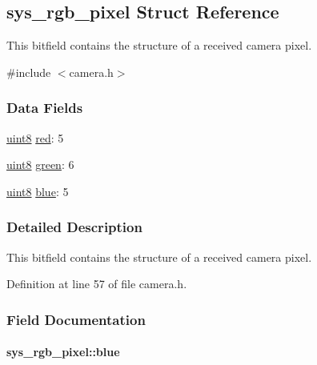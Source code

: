 \hypertarget{structsys__rgb__pixel}{}\subsection{sys\+\_\+rgb\+\_\+pixel Struct Reference}
\label{structsys__rgb__pixel}


This bitfield contains the structure of a received camera pixel.  




{\ttfamily \#include $<$camera.\+h$>$}

\subsubsection*{Data Fields}
\begin{DoxyCompactItemize}
\item 
\hyperlink{definitions_8h_adde6aaee8457bee49c2a92621fe22b79}{uint8} \hyperlink{structsys__rgb__pixel_a5238b3616428441f13d6afbaa3f9d538}{red}\+: 5
\item 
\hyperlink{definitions_8h_adde6aaee8457bee49c2a92621fe22b79}{uint8} \hyperlink{structsys__rgb__pixel_a7186eba1f72a58f28ff7a04caaffb8f6}{green}\+: 6
\item 
\hyperlink{definitions_8h_adde6aaee8457bee49c2a92621fe22b79}{uint8} \hyperlink{structsys__rgb__pixel_aa1c3593f42e5bc346d91e18a5842d755}{blue}\+: 5
\end{DoxyCompactItemize}


\subsubsection{Detailed Description}
This bitfield contains the structure of a received camera pixel. 

Definition at line 57 of file camera.\+h.



\subsubsection{Field Documentation}
\hypertarget{structsys__rgb__pixel_aa1c3593f42e5bc346d91e18a5842d755}{}
\paragraph[{blue}]{ sys\+\_\+rgb\+\_\+pixel\+::blue}\label{structsys__rgb__pixel_aa1c3593f42e5bc346d91e18a5842d755}


